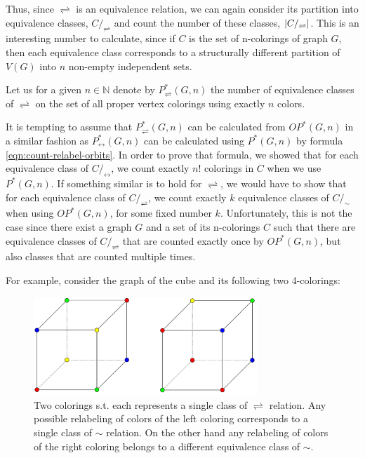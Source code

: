 Thus, since $\rightleftharpoons$ is an equivalence relation, we can again consider its partition into equivalence classes, $C/_\rightleftharpoons$ and count the number of these classes, $\left|{C/_\rightleftharpoons}\right|$. This is an interesting number to calculate, since if $C$ is the set of n-colorings of graph $G$, then each equivalence class corresponds to a structurally different partition of $V(G)$ into $n$ non-empty independent sets.

\begin{defn}
    Let us for a given $n \in \mathbb{N}$ denote by $P^*_{\rightleftharpoons}(G,n)$ the number of equivalence classes of $\rightleftharpoons$ on the set of all proper vertex colorings using exactly $n$ colors. 
\end{defn}

It is tempting to assume that $P^*_{\rightleftharpoons}(G,n)$ can be calculated from $OP^*(G,n)$ in a similar fashion as $P^*_{\leftrightarrow}(G,n)$ can be calculated using $P^*(G,n)$ by formula \ref{eqn:count-relabel-orbits}. In order to prove that formula, we showed that for each equivalence class of $C/_\leftrightarrow$, we count exactly $n!$ colorings in $C$ when we use $P^*(G,n)$. If something similar is to hold for $\rightleftharpoons$, we would have to show that for each equivalence class of $C/_\rightleftharpoons$, we count exactly $k$ equivalence classes of $C/_\sim$ when using $OP^*(G,n)$, for some fixed number $k$. Unfortunately, this is not the case since there exist a graph $G$ and a set of its n-colorings $C$ such that there are equivalence classes of $C/_\rightleftharpoons$ that are counted exactly once by $OP^*(G,n)$, but also classes that are counted multiple times.

For example, consider the graph of the cube and its following two 4-colorings:

\begin{figure}[H]
    \centering
    \includegraphics[width=0.75\textwidth]{Resources/Figs/example_diff_rel-aut_class_sizes.pdf}
    \caption{Two colorings s.t. each represents a single class of $\rightleftharpoons$ relation. Any possible relabeling of colors of the left coloring corresponds to a single class of $\sim$ relation. On the other hand any relabeling of colors of the right coloring belongs to a different equivalence class of $\sim$.}
    \label{fig:example-cube-4-clrings-diff-classes}
\end{figure}

